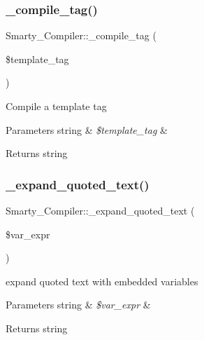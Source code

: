 \subsubsection{\texorpdfstring{\+\_\+compile\+\_\+tag()}{\_compile\_tag()}}
{\footnotesize\ttfamily Smarty\+\_\+\+Compiler\+::\+\_\+compile\+\_\+tag (\begin{DoxyParamCaption}\item[{}]{\$template\+\_\+tag }\end{DoxyParamCaption})}

Compile a template tag


\begin{DoxyParams}[1]{Parameters}
string & {\em \$template\+\_\+tag} & \\
\hline
\end{DoxyParams}
\begin{DoxyReturn}{Returns}
string 
\end{DoxyReturn}
\mbox{\label{class_smarty___compiler_aba11f398aa3e57fbf119bb1d718e854c}} 
\subsubsection{\texorpdfstring{\+\_\+expand\+\_\+quoted\+\_\+text()}{\_expand\_quoted\_text()}}
{\footnotesize\ttfamily Smarty\+\_\+\+Compiler\+::\+\_\+expand\+\_\+quoted\+\_\+text (\begin{DoxyParamCaption}\item[{}]{\$var\+\_\+expr }\end{DoxyParamCaption})}

expand quoted text with embedded variables


\begin{DoxyParams}[1]{Parameters}
string & {\em \$var\+\_\+expr} & \\
\hline
\end{DoxyParams}
\begin{DoxyReturn}{Returns}
string 
\end{DoxyReturn}
\mbox{\label{class_smarty___compiler_ac3298ba7a8acc1bafeaeae5428c3571e}} 
